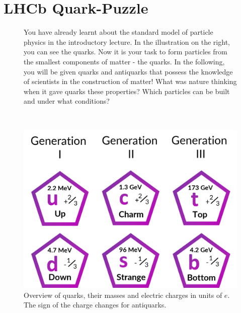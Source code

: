 \small
\section*{\huge{LHCb Quark-Puzzle}}
\begin{figure}[h]
    \begin{minipage}[t]{0.474\textwidth}
        You have already learnt about the standard model of particle physics in the introductory lecture. In the illustration on the right, you can see the quarks.  Now it is your task to form particles from the smallest components of matter - the quarks. In the following, you will be given quarks and antiquarks that possess the knowledge of scientists in the construction of matter! What was nature thinking when it gave quarks these properties? Which particles can be built and under what conditions? 
    \end{minipage}~~
     \begin{minipage}[t]{0.50\textwidth}
     \centering
       \vspace{-1cm}\includegraphics[width=.8\textwidth]{Figures Worksheets/Quarks_Quark_Puzzle_Worksheet.png}
         \caption{Overview of quarks, their masses and electric charges in units of $e$. The sign of the charge changes for antiquarks.}
    \end{minipage}
    \end{figure}
